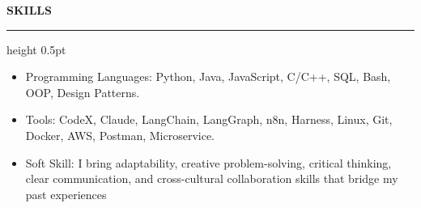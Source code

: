 \documentclass[11pt,letterpaper]{article}
\newcommand{\sectionhead}[1]{%
  \par\vspace{4.5pt}%
  {\bfseries #1}\par\nointerlineskip
  \vspace{5pt}%
  {\color{rulegray}\hrule height 0.5pt}%
  \vspace{11.7pt}%
}
\begin{document}
\vspace{6pt}

\sectionhead{SKILLS}

\begin{itemize}
  \item Programming Languages: Python, Java, JavaScript, C/C++, SQL, Bash, OOP, Design Patterns.
  \item Tools: CodeX, Claude, LangChain, LangGraph, n8n, Harness, Linux, Git, Docker, AWS, Postman, Microservice.
  \item Soft Skill: I bring adaptability, creative problem-solving, critical thinking, clear communication, and cross-cultural collaboration skills that bridge my past experiences
\end{itemize}
\end{document}
